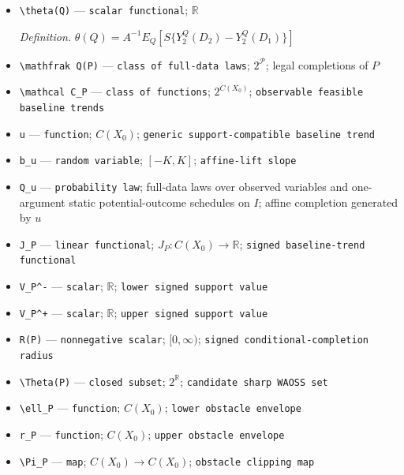 \documentclass{article}
\begin{document}
\begin{itemize}
  \item \texttt{\textbackslash{}\allowbreak{}theta(Q)} --- \texttt{scalar functional}; \(\mathbb R\)
  \par\smallskip\noindent\emph{Definition.} \(\theta(Q)=A^{-1}E_Q[S\{Y_2^Q(D_2)-Y_2^Q(D_1)\}]\)
  \item \texttt{\textbackslash{}\allowbreak{}mathfrak Q(P)} --- \texttt{class of full-\allowbreak{}data laws}; \(2^{\mathcal P}\); legal completions of \(P\)
  \item \texttt{\textbackslash{}\allowbreak{}mathcal C\_\allowbreak{}P} --- \texttt{class of functions}; \(2^{C(X_0)}\); \texttt{observable feasible baseline trends}
  \item \texttt{u} --- \texttt{function}; \(C(X_0)\); \texttt{generic support-\allowbreak{}compatible baseline trend}
  \item \texttt{b\_\allowbreak{}u} --- \texttt{random variable}; \([-K,K]\); \texttt{affine-\allowbreak{}lift slope}
  \item \texttt{Q\_\allowbreak{}u} --- \texttt{probability law}; full-data laws over observed variables and one-argument static potential-outcome schedules on \(I\); affine completion generated by \(u\)
  \item \texttt{J\_\allowbreak{}P} --- \texttt{linear functional}; \(J_P:C(X_0)\to\mathbb R\); \texttt{signed baseline-\allowbreak{}trend functional}
  \item \texttt{V\_\allowbreak{}P\textasciicircum{}-\allowbreak{}} --- \texttt{scalar}; \(\mathbb R\); \texttt{lower signed support value}
  \item \texttt{V\_\allowbreak{}P\textasciicircum{}+\allowbreak{}} --- \texttt{scalar}; \(\mathbb R\); \texttt{upper signed support value}
  \item \texttt{R(P)} --- \texttt{nonnegative scalar}; \([0,\infty)\); \texttt{signed conditional-\allowbreak{}completion radius}
  \item \texttt{\textbackslash{}\allowbreak{}Theta(P)} --- \texttt{closed subset}; \(2^{\mathbb R}\); \texttt{candidate sharp WAOSS set}
  \item \texttt{\textbackslash{}\allowbreak{}ell\_\allowbreak{}P} --- \texttt{function}; \(C(X_0)\); \texttt{lower obstacle envelope}
  \item \texttt{r\_\allowbreak{}P} --- \texttt{function}; \(C(X_0)\); \texttt{upper obstacle envelope}
  \item \texttt{\textbackslash{}\allowbreak{}Pi\_\allowbreak{}P} --- \texttt{map}; \(C(X_0)\to C(X_0)\); \texttt{obstacle clipping map}

\end{itemize}
\end{document}
